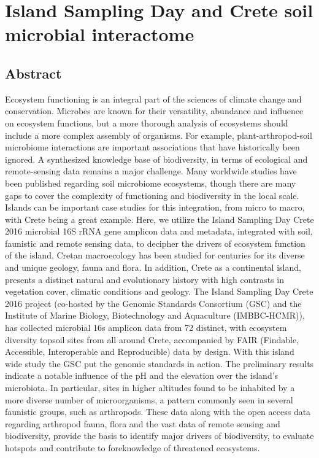% 
% 


\chapter{Island Sampling Day and Crete soil microbial interactome}
\label{cha:crete-soil}



\section{Abstract}
Ecosystem functioning is an integral part of the sciences of climate change and
conservation. Microbes are known for their versatility, abundance and influence
on ecosystem functions, but a more thorough analysis of ecosystems should
include a more complex assembly of organisms. For example, plant-arthropod-soil
microbiome interactions are important associations that have historically been
ignored. A synthesized knowledge base of biodiversity, in terms of ecological
and remote-sensing data remains a major challenge. Many worldwide studies have
been published regarding soil microbiome ecosystems, though there are many gaps
to cover the complexity of functioning and biodiversity in the local scale.
Islands can be important case studies for this integration, from micro to macro,
with Crete being a great example. Here, we utilize the Island Sampling Day
Crete 2016 microbial 16S rRNA gene amplicon data and metadata, integrated with
soil, faunistic and remote sensing data, to decipher the drivers of ecosystem
function of the island. Cretan macroecology has been studied for centuries for
its diverse and unique geology, fauna and flora. In addition, Crete as a
continental island, presents a distinct natural and evolutionary history with
high contrasts in vegetation cover, climatic conditions and geology. The Island
Sampling Day Crete 2016 project (co-hosted by the Genomic Standards Consortium
(GSC) and the Institute of Marine Biology, Biotechnology and Aquaculture (IMBBC-HCMR)),
has collected microbial 16s amplicon data from 72 distinct, with ecosystem
diversity topsoil sites from all around Crete, accompanied by
FAIR (Findable, Accessible, Interoperable and Reproducible) data by design.
With this island wide study the GSC put the genomic standards in action. The
preliminary results indicate a notable influence of the pH and the elevation
over the island's microbiota. In particular, sites in higher altitudes found to
be inhabited by a more diverse number of microorganisms, a pattern commonly
seen in several faunistic groups, such as arthropods. These data along with the
open access data regarding arthropod fauna, flora and the vast data of remote
sensing and biodiversity, provide the basis to identify major drivers of
biodiversity, to evaluate hotspots and contribute to foreknowledge of
threatened ecosystems.


